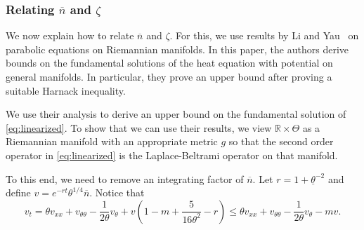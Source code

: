 \documentclass[11pt]{article}    %
\newcommand{\EB}[1]{\textcolor{blue}{#1}}
\newcommand{\R}{\mathbb{R}}
\begin{document}



















\subsubsection*{Relating $\overline n$ and $\zeta$}



We now explain how to relate $\overline n$ and $\zeta$. For this, we use results by Li and Yau~\cite[Corollary~3.2]{LiYau} on parabolic equations on Riemannian manifolds. In this paper, the authors derive bounds on the fundamental solutions of the heat equation with potential on general manifolds. In particular, they prove an upper bound after proving a suitable Harnack inequality.

We use their analysis to derive an upper bound on the fundamental solution of \eqref{eq:linearized}. To show that we can use their results, we view $\R\times\Theta$ as a Riemannian manifold with an appropriate metric $g$ so that the second order operator in \eqref{eq:linearized} is the Laplace-Beltrami operator on that manifold.

To this end, we need to remove an integrating factor of $\overline n$.  Let $r = 1+\underline \theta^{-2}$ and define $v = e^{-rt} \theta^{1/4} \overline n$. Notice that
\begin{equation}\label{eq:v_eqn}
	v_t = \theta v_{xx} + v_{\theta\theta} - \frac{1}{2\theta} v_\theta + v\left(1-m + \frac{5}{16 \theta^2} - r\right)
		\leq \theta v_{xx} + v_{\theta\theta} - \frac{1}{2\theta} v_\theta - mv.
\end{equation}
\end{document}
